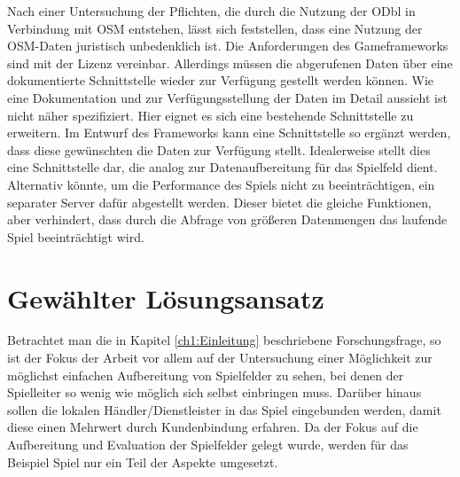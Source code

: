 Nach einer Untersuchung der Pflichten, die durch die Nutzung der ODbl in Verbindung mit OSM entstehen, lässt sich feststellen, dass eine Nutzung der OSM-Daten juristisch unbedenklich ist. 
Die Anforderungen des Gameframeworks sind mit der Lizenz vereinbar.
Allerdings müssen die abgerufenen Daten über eine dokumentierte Schnittstelle wieder zur Verfügung gestellt werden können.
Wie eine Dokumentation und zur Verfügungsstellung der Daten im Detail aussieht ist nicht näher spezifiziert. Hier eignet es sich eine bestehende Schnittstelle zu erweitern. Im Entwurf des Frameworks kann eine Schnittstelle so ergänzt werden, dass diese gewünschten die Daten zur Verfügung stellt. Idealerweise stellt dies eine Schnittstelle dar, die analog zur Datenaufbereitung für das Spielfeld dient. Alternativ könnte, um die Performance des Spiels nicht zu beeinträchtigen, ein separater Server dafür abgestellt werden. Dieser bietet die gleiche Funktionen, aber verhindert, dass durch die Abfrage von größeren Datenmengen das laufende Spiel beeinträchtigt wird.

\section{Gewählter Lösungsansatz}
\label{ch4:s:choosen_solution}

Betrachtet man die in Kapitel \ref{ch1:Einleitung} beschriebene Forschungsfrage, so ist der Fokus der Arbeit vor allem auf der Untersuchung einer Möglichkeit zur möglichst einfachen Aufbereitung von Spielfelder zu sehen, bei denen der Spielleiter so wenig wie möglich sich selbst einbringen muss. Darüber hinaus sollen die lokalen Händler/Dienstleister in das Spiel eingebunden werden, damit diese einen Mehrwert durch Kundenbindung erfahren.
Da der Fokus auf die Aufbereitung und Evaluation der Spielfelder gelegt wurde, werden für das Beispiel Spiel nur ein Teil der Aspekte umgesetzt.

